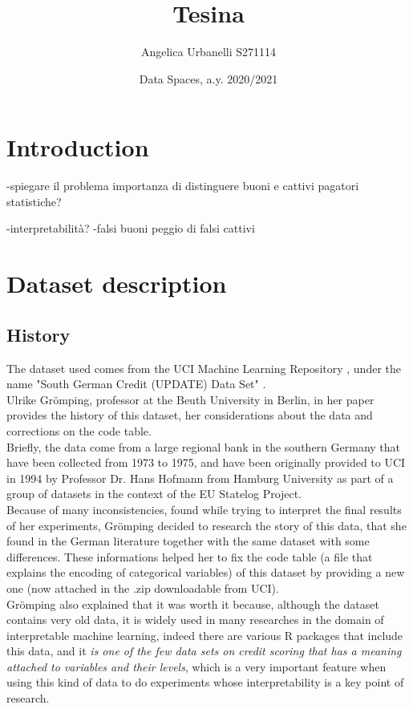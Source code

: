\documentclass[letterpaper]{article}
\begin{document}
	\title{Tesina}
	\author{Angelica Urbanelli S271114}
	\date{Data Spaces, a.y. 2020/2021}
	\maketitle
	
	\tableofcontents
	
	\newpage 
	\section{Introduction}
	-spiegare il problema
		importanza di distinguere buoni e cattivi pagatori
		statistiche?
		
	-interpretabilità?
	-falsi buoni peggio di falsi cattivi
	
	
	\section{Dataset description}
	\subsection{History}
	The dataset used comes from the UCI Machine Learning Repository \cite{uci}, under the name "South German Credit (UPDATE) Data Set" \cite{dataset}. \\
	Ulrike Grömping, professor at the Beuth University in Berlin, in her paper \cite{gromping} provides the history of this dataset, her considerations about the data and corrections on the code table.\\
	Briefly, the data come from a large regional bank in the southern Germany that have been collected from 1973 to 1975, and have been originally provided to UCI in 1994 by Professor Dr. Hans Hofmann from Hamburg University \cite{hofmann} as part of a group of datasets in the context of the EU Statelog Project.\\
	Because of many inconsistencies, found while trying to interpret the final results of her experiments, Grömping decided to research the story of this data, that she found in the German literature together with the same dataset with some differences. These informations helped her	to fix the code table (a file that explains the encoding of categorical variables) of this dataset by providing a new one (now attached in the .zip downloadable from UCI).\\ 
	Grömping also explained that it was worth it because, although the dataset contains very old data, it is widely used in many researches in the domain of interpretable machine learning, indeed there are various R packages that include this data, and it \emph{is one of the few data sets on credit scoring that has a meaning attached to variables and their levels}, which is a very important feature when using this kind of data to do experiments whose interpretability is a key point of research.  \\
	
\end{document}
